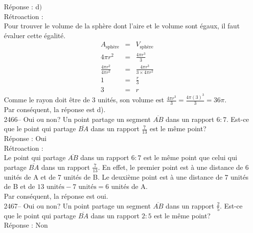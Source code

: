 \documentclass[letterpaper, 12pt]{article}
\begin{document}
R\'eponse : d$)$\\

R\'etroaction :\\
Pour trouver le volume de la sph\`ere dont l'aire et le volume sont \'egaux, il faut \'evaluer cette \'egalit\'e.
\begin{eqnarray*}
A_{\textrm{sph\`ere}}&=&V_{\textrm{sph\`ere}}\\[2mm]
 4\pi r^{2} &=& \frac{4\pi r^{3}}{3}\\[2mm]
 \frac{4\pi r^{2} }{4\pi r^{2} }&=& \frac{4\pi r^{3}}{3\times 4\pi r^{2} }\\[2mm]
1&=& \frac{r}{3}\\[2mm]
3&=& r
\end{eqnarray*}
Comme le rayon doit \^etre de 3 unit\'es, son volume est $\frac{4\pi r^{3}}{3}=\frac{4\pi (3)^{3}}{3}=36\pi$.\\
Par cons\'equent, la r\'eponse est d).\\

2466-- Oui ou non? Un point partage un segment $\overline{AB}$ dans un rapport $6:7$. Est-ce que le point qui partage $\overline{BA}$ dans un rapport $\frac{7}{13}$ est le m\^eme point?\\

R\'eponse : Oui\\

R\'etroaction :\\
Le point qui partage $\overline{AB}$ dans un rapport $6:7$ est le m\^eme point que celui qui partage $\overline{BA}$ dans un rapport $\frac{7}{13}$. En effet, le premier point est \`a une distance de 6 unit\'es de A et de 7 unit\'es de B. Le deuxi\`eme point est \`a une distance de 7 unit\'es de B et de $13\textrm{ unit\'es}- 7\textrm{ unit\'es}=6$ unit\'es de A.\\
Par cons\'equent, la r\'eponse est oui.\\

2467-- Oui ou non? Un point partage un segment $\overline{AB}$ dans un rapport $\frac{2}{5}$. Est-ce que le point qui partage $\overline{BA}$ dans un rapport $2:5$ est le m\^eme point?\\

R\'eponse : Non\\
\end{document}
